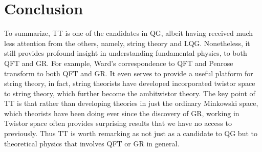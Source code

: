 \documentclass{article}
\begin{document}
        \section{Conclusion}%
          \label{sec:Conclusion}
          To summarize, TT is one of the candidates in QG, albeit
          having received much less attention from the others,
          namely, string theory and LQG. Nonetheless, it still
          provides profound insight in understanding fundamental
          physics, to both QFT and GR. For example, 
          Ward's correspondence to QFT and Penrose transform to
          both QFT and GR. It even serves to provide a useful
          platform for string theory, in fact, string theorists
          have developed incorporated twistor space to string
          theory, which further
          become the ambitwistor
          theory\cite{geyer2014ambitwistor}. The key point of TT is
          that rather than developing theories in just the
          ordinary Minkowski space, which theorists have been
          doing ever since the discovery of GR, working in Twistor
          space often provides surprising results that we have no
          access to previously. Thus TT is worth remarking as not
          just as a candidate to QG but to theoretical physics
          that involves QFT or GR in general. 
\end{document}
